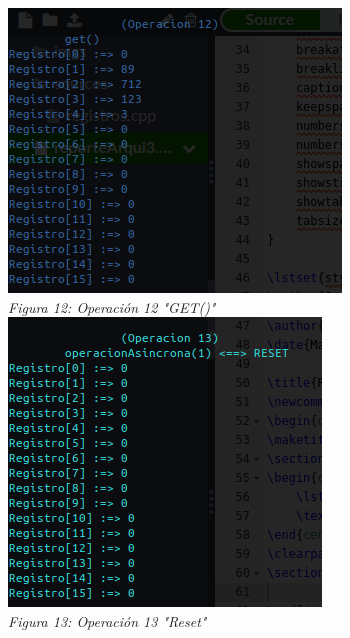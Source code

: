 \documentclass[12pt,executivepaper]{article}
\begin{document}
\begin{center}
    \includegraphics[scale=1]{imgs/trece.png}\\
    \textit{Figura 12: Operación 12 "GET()"}\\
    \includegraphics[scale=1]{imgs/catorce.png}\\
    \textit{Figura 13: Operación 13 "Reset"}\\
    
\end{center}
\end{document}
